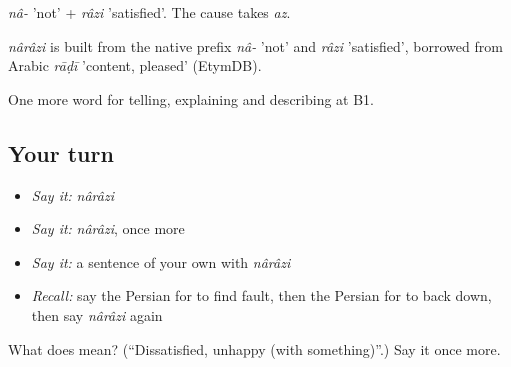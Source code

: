 \emph{nâ-} 'not' + \emph{râzi} 'satisfied'. The cause takes \emph{az}.

\begin{cousinweb}
\emph{nârâzi} is built from the native prefix \emph{nâ-} 'not' and \emph{râzi} 'satisfied', borrowed from Arabic \emph{rāḍī} 'content, pleased' (EtymDB).
\end{cousinweb}

\begin{grammarlens}[title={What you've built}]
One more word for telling, explaining and describing at B1.
\end{grammarlens}

\subsection*{Your turn}
\begin{itemize}
\raggedright
  \item \emph{Say it:} \emph{nârâzi}
  \item \emph{Say it:} \emph{nârâzi}, once more
  \item \emph{Say it:} a sentence of your own with \emph{nârâzi}
  \item \emph{Recall:} say the Persian for to find fault, then the Persian for to back down, then say \emph{nârâzi} again
\end{itemize}

\begin{tcolorbox}[breakable,colback=teal!4,colframe=teal!35!black,title={Before you move on}]
What does  mean? (\textquotedblleft{}Dissatisfied, unhappy (with something)\textquotedblright{}.) Say it once more.
\end{tcolorbox}
